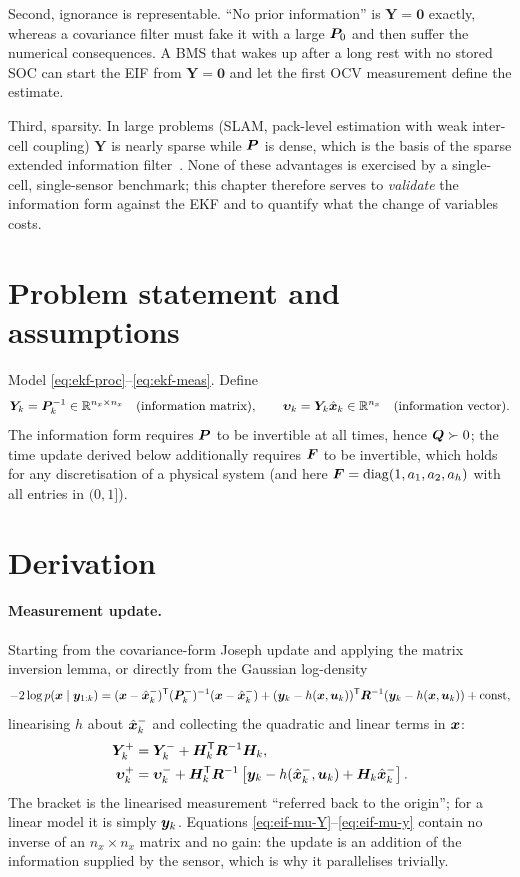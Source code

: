 Second, ignorance is representable. ``No prior information'' is $\bm{Y} = \bm{0}$ exactly, whereas
a covariance filter must fake it with a large $\bm{P}_0$ and then suffer the numerical
consequences. A BMS that wakes up after a long rest with no stored SOC can start the EIF from
$\bm{Y}=\bm0$ and let the first OCV measurement define the estimate.

Third, sparsity. In large problems (SLAM, pack-level estimation with weak inter-cell
coupling) $\bm{Y}$ is nearly sparse while $\bm{P}$ is dense, which is the basis of the sparse
extended information filter~\cite{thrun2005}. None of these advantages is exercised by a
single-cell, single-sensor benchmark; this chapter therefore serves to \emph{validate} the
information form against the EKF and to quantify what the change of variables costs.

\section{Problem statement and assumptions}
Model \eqref{eq:ekf-proc}--\eqref{eq:ekf-meas}. Define
\begin{equation}
\bm{Y}_k = \bm{P}_k^{-1} \in\mathbb{R}^{n_x\times n_x} \quad\text{(information matrix)},\qquad
\bm{\upsilon}_k = \bm{Y}_k\hat{\bm{x}}_k \in\mathbb{R}^{n_x} \quad\text{(information vector)}.
\label{eq:eif-defs}
\end{equation}
The information form requires $\bm{P}$ to be invertible at all times, hence $\bm{Q}\succ0$; the
time update derived below additionally requires $\bm{F}$ to be invertible, which holds for any
discretisation of a physical system (and here $\bm{F}=\operatorname{diag}(1,a_1,a_2,a_h)$ with all entries in
$(0,1]$).

\section{Derivation}
\paragraph{Measurement update.} Starting from the covariance-form Joseph update and applying
the matrix inversion lemma, or directly from the Gaussian log-density
\begin{equation}
-2\log p(\bm{x}\mid\bm{y}_{1:k}) = (\bm{x}-\hat{\bm{x}}^{-}_k)^{\mathsf{T}}(\bm{P}^{-}_k)^{-1}(\bm{x}-\hat{\bm{x}}^{-}_k)
 + (\bm{y}_k-h(\bm{x},\bm{u}_k))^{\mathsf{T}}\bm{R}^{-1}(\bm{y}_k-h(\bm{x},\bm{u}_k)) + \text{const},
\label{eq:eif-logpost}
\end{equation}
linearising $h$ about $\hat{\bm{x}}^{-}_k$ and collecting the quadratic and linear terms in $\bm{x}$:
\begin{align}
\bm{Y}^+_k &= \bm{Y}^-_k + \bm{H}_k^{\mathsf{T}}\bm{R}^{-1}\bm{H}_k, \label{eq:eif-mu-Y}\\
\bm\upsilon^+_k &= \bm\upsilon^-_k + \bm{H}_k^{\mathsf{T}}\bm{R}^{-1}\left[\bm{y}_k - h(\hat{\bm{x}}^{-}_k,\bm{u}_k) + \bm{H}_k\hat{\bm{x}}^{-}_k\right].
\label{eq:eif-mu-y}
\end{align}
The bracket is the linearised measurement ``referred back to the origin''; for a linear model
it is simply $\bm{y}_k$. Equations \eqref{eq:eif-mu-Y}--\eqref{eq:eif-mu-y} contain no inverse of
an $n_x\times n_x$ matrix and no gain: the update is an addition of the information supplied
by the sensor, which is why it parallelises trivially.

